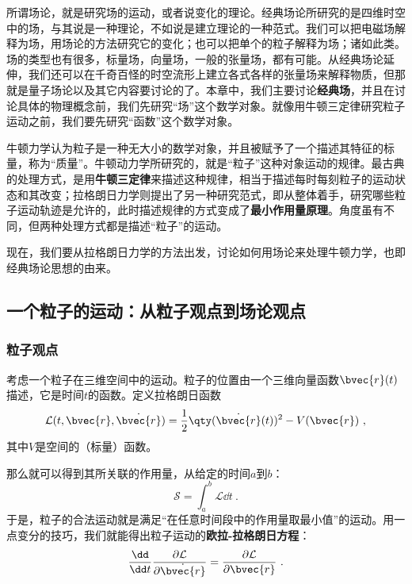 





所谓场论，就是研究场的运动，或者说变化的理论。经典场论所研究的是四维时空中的场，与其说是一种理论，不如说是建立理论的一种范式。我们可以把电磁场解释为场，用场论的方法研究它的变化；也可以把单个的粒子解释为场；诸如此类。场的类型也有很多，标量场，向量场，一般的张量场，都有可能。从经典场论延伸，我们还可以在千奇百怪的时空流形上建立各式各样的张量场来解释物质，但那就是量子场论以及其它内容要讨论的了。本章中，我们主要讨论\textbf{经典场}，并且在讨论具体的物理概念前，我们先研究“场”这个数学对象。就像用牛顿三定律研究粒子运动之前，我们要先研究“函数”这个数学对象。

牛顿力学认为粒子是一种无大小的数学对象，并且被赋予了一个描述其特征的标量，称为“质量”。牛顿动力学所研究的，就是“粒子”这种对象运动的规律。最古典的处理方式，是用\textbf{牛顿三定律}来描述这种规律，相当于描述每时每刻粒子的运动状态和其改变；拉格朗日力学则提出了另一种研究范式，即从整体着手，研究哪些粒子运动轨迹是允许的，此时描述规律的方式变成了\textbf{最小作用量原理}。角度虽有不同，但两种处理方式都是描述“粒子”的运动。

现在，我们要从拉格朗日力学的方法出发，讨论如何用场论来处理牛顿力学，也即经典场论思想的由来。


\subsection{一个粒子的运动：从粒子观点到场论观点}

\subsubsection{粒子观点}

考虑一个粒子在三维空间中的运动。粒子的位置由一个三维向量函数$\bvec{r}(t)$描述，它是时间$t$的函数。定义拉格朗日函数
\begin{equation}
\mathcal{L}(t, \bvec{r},\dot{\bvec{r}}) =\frac{1}{2}\qty(\dot{\bvec{r}}(t))^2-V(\bvec{r})~,
\end{equation}
其中$V$是空间的（标量）函数。

那么就可以得到其所关联的作用量，从给定的时间$a$到$b$：
\begin{equation}
\mathcal{S}=\int ^b_a \mathcal{L} \dd t~.
\end{equation}
于是，粒子的合法运动就是满足“在任意时间段中的作用量取最小值”的运动。用一点变分的技巧，我们就能得出粒子运动的\textbf{欧拉-拉格朗日方程}：
\begin{equation}\label{eq_CFa1_1}
\frac{\dd}{\dd t}\frac{\partial\mathcal{L}}{\partial \dot{\bvec{r}}} = \frac{\partial\mathcal{L}}{\partial \bvec{r}}~.
\end{equation}

